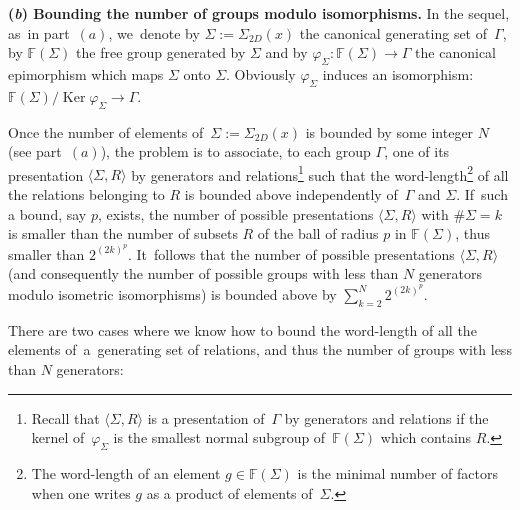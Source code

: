 \documentclass[pdftex]{sigma}
\numberwithin{equation}{section}
\newcommand{\f}{\rightarrow}
\newcommand{\Ker}{\operatorname{Ker}}
\begin{document}
\medskip\noindent
{\bf (\emph{b}) Bounding the number of groups modulo isomorphisms.}
In the sequel, as~in part~$(a)$, we~denote by $\Sigma := \Sigma_{2 D} (x) $ the canonical generating set of~$\Gamma$, by $\mathbb F (\Sigma)$
the free group generated by $\Sigma$ and by $\varphi_{\Sigma} \colon \mathbb F
(\Sigma) \f \Gamma$ the canonical epimorphism which maps $\Sigma$ onto
$\Sigma$. Obviously $\varphi_{\Sigma}$ induces an isomorphism: $ \mathbb
F (\Sigma) / {\Ker \varphi_{\Sigma}} \to \Gamma $.

Once the number of elements of~$\Sigma := \Sigma_{2 D} (x) $ is bounded
by some integer $N$ (see part~$(a)$), the problem is to associate,
to each group $\Gamma$, one of its presentation $\langle \Sigma, R \rangle$ by generators and relations\footnote{Recall that $\langle \Sigma, R \rangle$ is a presentation of~$\Gamma$ by generators and relations if the kernel of~$\varphi_{\Sigma}$ is the smallest normal subgroup of~$\mathbb F (\Sigma)$ which contains $R$.}
such that the word-length\footnote{The word-length of an element $g \in \mathbb F (\Sigma)$ is the minimal number of factors when one writes
$g$ as a product of elements of~$\Sigma$.} of all the relations belonging
to $R$ is bounded above independently of~$\Gamma$ and $\Sigma$. If~such a bound, say $p$, exists, the number of possible presentations $\langle \Sigma, R \rangle$ with $\# \Sigma = k$ is smaller than the number of subsets $R$
of the ball of radius $p$ in $\mathbb F (\Sigma)$, thus smaller than $2^{(2 k)^p}$. It~follows that the number of possible presentations $\langle \Sigma, R \rangle$ (and consequently the number of possible groups with less than $N$ generators modulo isometric isomorphisms) is bounded above by $\sum_{k = 2}^N 2^{(2k)^p}$.

There are two cases where we know how to bound the word-length of all the
elements of~a~gene\-ra\-ting set of relations, and thus the number of groups with
less than $N$ generators:
\end{document}
